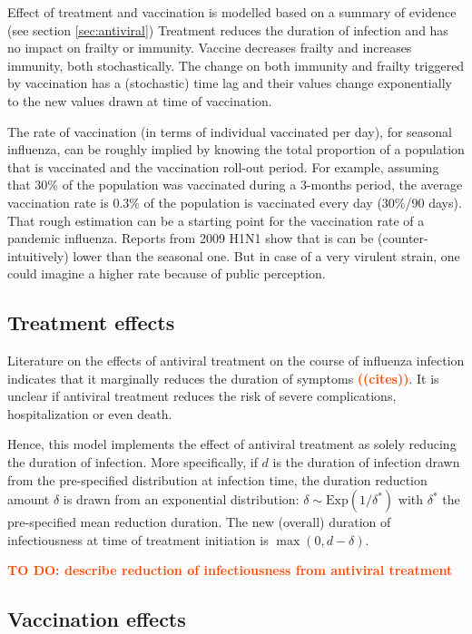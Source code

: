 \documentclass[11pt, onecolumn]{article}
\newcommand{\warning}[1]{\textbf{\textcolor{OrangeRed}{#1}}}
\begin{document}
Effect of treatment and vaccination is modelled based on a summary of evidence (see section \ref{sec:antiviral})
Treatment reduces the duration of infection and has no impact on frailty or immunity. Vaccine decreases frailty and increases immunity, both stochastically. The change on both immunity and frailty triggered by vaccination has a (stochastic) time lag and their values change exponentially to the new values drawn at time of vaccination.

The rate of vaccination (in terms of individual vaccinated per day), for seasonal influenza, can be roughly implied by knowing the total proportion of a population that is vaccinated and the vaccination roll-out period. For example, assuming that 30\% of the population was vaccinated during a 3-months period, the average vaccination rate is 0.3\% of the population is vaccinated every day (30\%/90 days).
That rough estimation can be a starting point for the vaccination rate of a pandemic influenza. Reports from 2009 H1N1 show that is can be (counter-intuitively) lower than the seasonal one. But in case of a very virulent strain, one could imagine a higher rate because of public perception. 

\subsection{Treatment effects}

Literature on the effects of antiviral treatment on the course of influenza infection indicates that it marginally reduces the duration of symptoms \warning{((cites))}. It is unclear if antiviral treatment reduces the risk of severe complications, hospitalization or even death. 

Hence, this model implements the effect of antiviral treatment as solely reducing the duration of infection. More specifically, if $d$ is the duration of infection drawn from the pre-specified distribution at infection time, the duration reduction amount $\delta$ is drawn from an exponential distribution: $\delta \sim \text{Exp}(1/\delta^*)$ with $\delta^*$ the pre-specified mean reduction duration. The new (overall) duration of infectiousness at time of treatment initiation is $\max(0, d-\delta)$.

\warning{TO DO: describe reduction of infectiousness from antiviral treatment}

\subsection{Vaccination effects}
\end{document}
